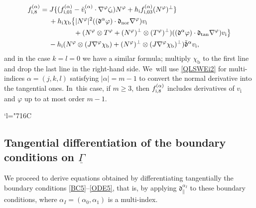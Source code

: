 \documentclass[10pt]{amsart}
\newcommand{\Changelback}{\mathcode`l="716C}
\newcommand{\dtan}{{\mathfrak d}_\mathrm{tan}}
\newcommand{\dnor}{{\mathfrak d}_\mathrm{nor}}
\newcommand{\dpar}{{\mathfrak d}_{\parallel}}
\newcommand{\ul}[1]{\underline{#1}}
\newcommand{\itGamma}{\mathit{\Gamma}}
\newcommand{\cmfalpha}{\check{\mathfrak{d}}^{\alpha}}
\theoremstyle{definition}
\begin{document}
\begin{align*}
f_{{\rm i},8}^{(\alpha)}
&= J \{ (f_{{\rm i}, 01}^{(\alpha)} - \check{v}_\mathrm{i}^{(\alpha)}\cdot\nabla^\varphi\zeta_\mathrm{i})N^\varphi
+ h_\mathrm{i}f_{{\rm i},03}^{(\alpha)}(N^\varphi)^\perp \} \\
&\quad\;
+ h_\mathrm{i}\chi_\mathrm{b} \big\{ |N^\varphi|^2((\mathfrak{d}^\alpha\varphi)\cdot\dnor\nabla^\varphi)v_\mathrm{i} \\
&\hspace{1.7cm} + (N^\varphi\otimes T^\varphi + (N^\varphi)^\perp\otimes(T^\varphi)^\perp)((\mathfrak{d}^\alpha\varphi)\cdot\dtan\nabla^\varphi)v_\mathrm{i} \big\} \\
&\quad\:
- h_\mathrm{i}(N^\varphi\otimes(J\nabla^\varphi\chi_\mathrm{b}) + (N^\varphi)^\perp\otimes(J\nabla^\varphi\chi_\mathrm{b})^\perp) \cmfalpha v_\mathrm{i},
\end{align*}
and in the case $k=l=0$ we have a similar formula; multiply $\chi_\mathrm{b}$ to the first line and drop the last line in the right-hand side. We~will use \eqref{QLSWEi2} for multi-indices $\alpha=(j,k,l)$ satisfying $|\alpha|=m-1$ to convert the normal derivative into the tangential ones. In~this case, if $m\geq3$, then $f_{{\rm i},8}^{(\alpha)}$ includes derivatives of $v_\mathrm{i}$ and $\varphi$ up to at most order $m-1$.

\Changelback

\subsection{Tangential differentiation of the boundary conditions on $\ul{\itGamma}$}\label{secttangdiff}
We proceed to derive equations obtained by differentiating tangentially the boundary conditions \eqref{BC5}--\eqref{ODE5},
that is, by applying $\dpar^{\alpha_I}$ to these boundary conditions, where $\alpha_I=(\alpha_0,\alpha_1)$ is a multi-index.
\end{document}
